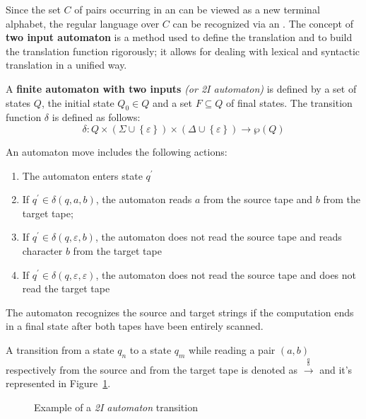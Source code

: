 \documentclass[english]{article}
\begin{document}
Since the set \(C\) of pairs occurring in an \rte can be viewed as a new terminal alphabet, the regular language over \(C\) can be recognized via an \FSA.
The concept of \textbf{two input automaton} is a method used to define the translation and to build the translation function rigorously;
it allows for dealing with lexical and syntactic translation in a unified way.

\begin{definition}[2I automaton]
  A \textbf{finite automaton with two inputs} \textit{(or 2I automaton)} is defined by a set of states \(Q\), the initial state \(Q_0 \in Q\) and a set \(F \subseteq Q\) of final states.
  The transition function \(\delta\) is defined as follows:
  \[ \delta : Q \times \left( \Sigma \cup \left\{ \varepsilon \right\} \right) \times \left( \Delta \cup \left\{ \varepsilon \right\} \right) \rightarrow \wp (Q) \]
\end{definition}

An automaton move includes the following actions:

\begin{enumerate}
  \item The automaton enters state \(q^\prime\)
  \item If \(q^\prime \in \delta(q, a, b)\), the automaton reads \(a\) from the source tape and \(b\) from the target tape;
  \item If \(q^\prime \in \delta(q, \varepsilon, b)\), the automaton does not read the source tape and reads character \(b\) from the target tape
  \item If \(q^\prime \in \delta(q, \varepsilon,\varepsilon)\), the automaton does not read the source tape and does not read the target tape
\end{enumerate}

The automaton recognizes the source and target strings if the computation ends in a final state after both tapes have been entirely scanned.

A transition from a state \(q_n\) to a state \(q_m\) while reading a pair \(\left( a, b \right)\) respectively from the source and from the target tape is denoted as \(\xrightarrow{\frac{a}{b}}\) and it's represented in Figure~\ref{fig:2I-automaton-transition-example}.

\begin{figure}[htbp]
  \centering
  \bigskip
  \caption{Example of a \textit{2I automaton} transition}
  \label{fig:2I-automaton-transition-example}
  \bigskip
\end{figure}
\end{document}
